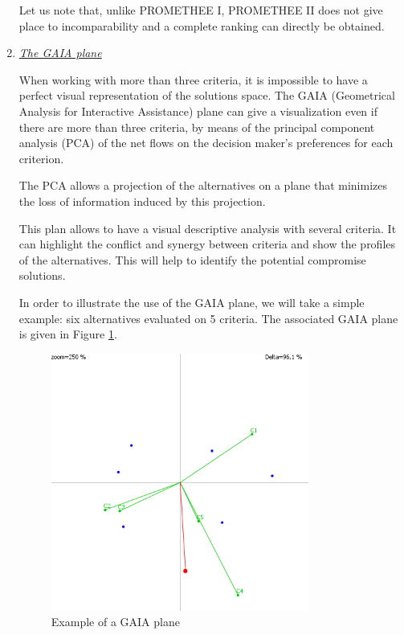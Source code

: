 \begin{enumerate}
Let us note that, unlike PROMETHEE I, PROMETHEE II does not give place to incomparability and a complete ranking can directly be obtained.

\item \textit{\underline{The GAIA plane}}

When working with more than three criteria, it is impossible to have a perfect visual representation of the solutions space. The GAIA (Geometrical Analysis for Interactive Assistance) plane can give a visualization even if there are more than three criteria, by means of the principal component analysis (PCA) of the net flows on the decision maker's preferences for each criterion.

The PCA allows a projection of the alternatives on a plane that minimizes the loss of information induced by this projection.

This plan allows to have a visual descriptive analysis with several criteria. It can highlight the conflict and synergy between criteria and show the profiles of the alternatives. This will help to identify the potential compromise solutions.

In order to illustrate the use of the GAIA plane, we will take a simple example: six alternatives evaluated on 5 criteria. The associated GAIA plane is given in Figure \ref{fig:gaiacar}.

\begin{figure}[h!]
\begin{center}
\includegraphics[width=0.8\textwidth]{gaiacar.png}
\end{center}
\caption{Example of a GAIA plane}
\label{fig:gaiacar}
\end{figure}


\end{enumerate}
